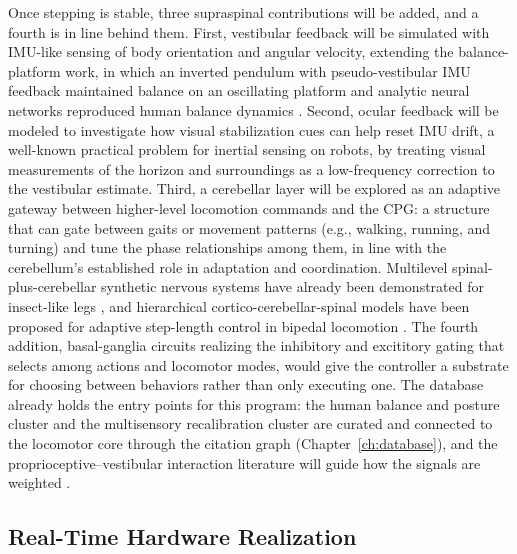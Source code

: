Once stepping is stable, three supraspinal contributions will be added, and a fourth is in line behind them. First, vestibular feedback will be simulated with IMU-like sensing of body orientation and angular velocity, extending the balance-platform work, in which an inverted pendulum with pseudo-vestibular IMU feedback maintained balance on an oscillating platform \citep{bolen_balance_2024, bolen_selfbalancing_2024, bolen_selfbalancing_srs_2024} and analytic neural networks reproduced human balance dynamics \citep{hilts_dynamic_2019}. Second, ocular feedback will be modeled to investigate how visual stabilization cues can help reset IMU drift, a well-known practical problem for inertial sensing on robots, by treating visual measurements of the horizon and surroundings as a low-frequency correction to the vestibular estimate. Third, a cerebellar layer will be explored as an adaptive gateway between higher-level locomotion commands and the CPG: a structure that can gate between gaits or movement patterns (e.g., walking, running, and turning) and tune the phase relationships among them, in line with the cerebellum's established role in adaptation and coordination. Multilevel spinal-plus-cerebellar synthetic nervous systems have already been demonstrated for insect-like legs \citep{grummer_multilevel_2024}, and hierarchical cortico-cerebellar-spinal models have been proposed for adaptive step-length control in bipedal locomotion \citep{chen_corticocerebellar_2025}. The fourth addition, basal-ganglia circuits realizing the inhibitory and excititory gating that selects among actions and locomotor modes, would give the controller a substrate for choosing between behaviors rather than only executing one. The database already holds the entry points for this program: the human balance and posture cluster and the multisensory recalibration cluster are curated and connected to the locomotor core through the citation graph (Chapter~\ref{ch:database}), and the proprioceptive--vestibular interaction literature will guide how the signals are weighted \citep{akay_relative_2021}.

\subsection{Real-Time Hardware Realization}\label{sec:fw_hardware}

